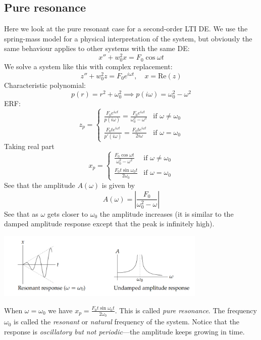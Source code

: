 \documentclass{report}
\begin{document}
\subsection{Pure resonance}
Here we look at the pure resonant case for a second-order LTI DE. We use the spring-mass model for a physical
interpretation of the system, but obviously the same behaviour applies to other systems with the same DE:
\begin{equation*}
x''+w_0^2x=F_0\cos\omega t
\end{equation*}
We solve a system like this with complex replacement:
\begin{equation*}
z''+w_0^2z=F_0e^{i\omega t},\quad x=\text{Re}(z)
\end{equation*}
Characteristic polynomial:
\begin{equation*}
p(r)=r^2+\omega_0^2\implies p(i\omega)=\omega_0^2-\omega^2
\end{equation*}
ERF:
\begin{equation*}
z_p=\begin{cases}
\frac{F_0e^{i\omega t}}{p(i\omega)}=\frac{F_0e^{i\omega t}}{\omega_0^2-\omega^2}&\text{if $\omega\neq\omega_0$}
\\
\frac{F_0te^{i\omega t}}{p'(i\omega)}=\frac{F_0te^{i\omega t}}{2i\omega}&\text{if $\omega=\omega_0$}
\end{cases}
\end{equation*}
Taking real part
\begin{equation*}
x_p=\begin{cases}
\frac{F_0\cos\omega t}{\omega_0^2-\omega^2}&\text{if $\omega\neq\omega_0$}\\
\frac{F_0t\sin\omega_0t}{2\omega_0}&\text{if $\omega=\omega_0$}
\end{cases}
\end{equation*}
See that the amplitude $A(\omega)$ is given by
\begin{equation*}
A(\omega)=\left|\frac{F_0}{\omega_0^2-\omega}\right|
\end{equation*}
See that as $\omega$ gets closer to $\omega_0$ the amplitude increases (it is similar to the damped amplitude
response except that the peak is infinitely high). 
\begin{center}
\includegraphics[width=10cm]{33}\\
\end{center}
When $\omega=\omega_0$ we have $x_p=\frac{F_0t\sin\omega_0t}{2\omega_0}$. This is called \textit{pure resonance}.
The frequency $\omega_0$ is called the \textit{resonant} or \textit{natural} frequency of the system.
Notice that the response is \textit{oscillatory but not periodic}---the amplitude keeps growing in time.
\newpage
\end{document}
